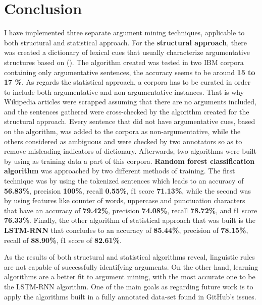 
\chapter{Conclusion}
\label{Chapter6}

I have implemented three separate argument mining techniques, applicable to both structural and statistical approach. For the \textbf{structural approach}, there was created a dictionary of lexical cues that usually characterize argumentative structures based on (\cite{knott1994using}). The algorithm created was tested in two IBM corpora containing only argumentative sentences, the accuracy seems to be around \textbf{15 to 17 \%}. As regards the statistical approach, a corpora has to be curated in order to include both argumentative and non-argumentative instances. That is why Wikipedia articles were scrapped assuming that there are no arguments included, and the sentences gathered were cross-checked by the algorithm created for the structural approach. Every sentence that did not have argumentative cues, based on the algorithm, was added to the corpora as non-argumentative, while the others considered as ambiguous and were checked by two annotators so as to remove misleading indicators of dictionary. Afterwards, two algorithms were built by using as training data a part of this corpora. \textbf{Random forest classification algorithm} was approached by two different methods of training. The first technique was by using the tokenized sentences which leads to an accuracy of \textbf{56.83\%}, precision \textbf{100\%}, recall \textbf{0.55\%}, f1 score \textbf{71.13\%}, while the second was by using features like counter of words, uppercase and punctuation characters that have an accuracy of \textbf{79.42\%},  precision \textbf{74.08\%}, recall \textbf{78.72\%}, and f1 score \textbf{76.33\%}. Finally, the other algorithm of statistical approach that was built is the \textbf{LSTM-RNN} that concludes to an accuracy of \textbf{85.44\%}, precision of \textbf{78.15\%}, recall of \textbf{88.90\%}, f1 score of \textbf{82.61\%}. 

As the results of both structural and statistical algorithms reveal, linguistic rules are not capable of successfully identifying arguments. On the other hand, learning algorithms are a better fit to argument mining, with the most accurate one to be the LSTM-RNN algorithm. One of the main goals as regarding future work is to apply the algorithms built in a fully annotated data-set found in GitHub's issues.